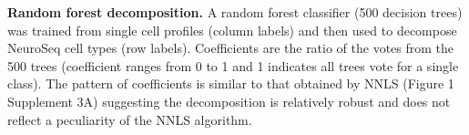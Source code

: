 \textbf{Random forest decomposition. }
A random forest classifier (500 decision trees) was trained from single cell profiles (column labels) and then used to decompose NeuroSeq cell types (row labels). Coefficients are the ratio of the votes from the 500 trees (coefficient ranges from 0 to 1 and 1 indicates all trees vote for a single class). The pattern of coefficients is similar to that obtained by NNLS (Figure 1 Supplement 3A) suggesting the decomposition is relatively robust and does not reflect a peculiarity of the NNLS algorithm.
